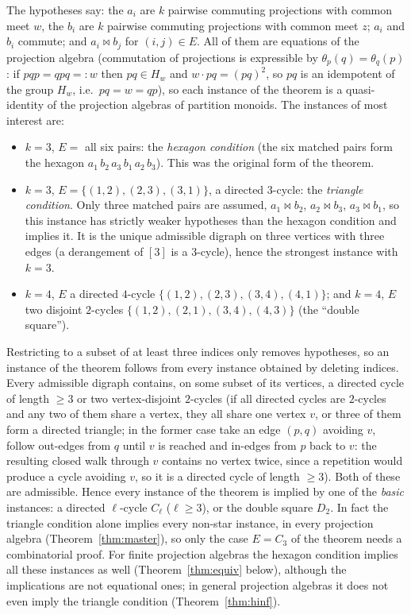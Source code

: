 \documentclass[11pt]{amsart}
\theoremstyle{definition}
\begin{document}
The hypotheses say: the $a_i$ are $k$ pairwise commuting projections with common meet $w$, the $b_i$ are $k$ pairwise commuting projections with common meet $z$; $a_i$ and $b_i$ commute; and $a_i\bowtie b_j$ for $(i,j)\in E$. All of them are equations of the projection algebra (commutation of projections is expressible by $\theta_p(q)=\theta_q(p)$: if $pqp=qpq=:w$ then $pq\in H_w$ and $w\cdot pq=(pq)^2$, so $pq$ is an idempotent of the group $H_w$, i.e.\ $pq=w=qp$), so each instance of the theorem is a quasi-identity of the projection algebras of partition monoids. The instances of most interest are:
\begin{itemize}[nosep]
\item $k=3$, $E=$ all six pairs: the \emph{hexagon condition} (the six matched pairs form the hexagon $a_1\,b_2\,a_3\,b_1\,a_2\,b_3$). This was the original form of the theorem.
\item $k=3$, $E=\{(1,2),(2,3),(3,1)\}$, a directed $3$-cycle: the \emph{triangle condition}. Only three matched pairs are assumed, $a_1\bowtie b_2$, $a_2\bowtie b_3$, $a_3\bowtie b_1$, so this instance has strictly weaker hypotheses than the hexagon condition and implies it. It is the unique admissible digraph on three vertices with three edges (a derangement of $[3]$ is a $3$-cycle), hence the strongest instance with $k=3$.
\item $k=4$, $E$ a directed $4$-cycle $\{(1,2),(2,3),(3,4),(4,1)\}$; and $k=4$, $E$ two disjoint $2$-cycles $\{(1,2),(2,1),(3,4),(4,3)\}$ (the ``double square'').
\end{itemize}
Restricting to a subset of at least three indices only removes hypotheses, so an instance of the theorem follows from every instance obtained by deleting indices. Every admissible digraph contains, on some subset of its vertices, a directed cycle of length $\ge3$ or two vertex-disjoint $2$-cycles (if all directed cycles are $2$-cycles and any two of them share a vertex, they all share one vertex $v$, or three of them form a directed triangle; in the former case take an edge $(p,q)$ avoiding $v$, follow out-edges from $q$ until $v$ is reached and in-edges from $p$ back to $v$: the resulting closed walk through $v$ contains no vertex twice, since a repetition would produce a cycle avoiding $v$, so it is a directed cycle of length $\ge3$). Both of these are admissible. Hence every instance of the theorem is implied by one of the \emph{basic} instances: a directed $\ell$-cycle $C_\ell$ ($\ell\ge3$), or the double square $D_2$. In fact the triangle condition alone implies every non-star instance, in every projection algebra (Theorem~\ref{thm:master}), so only the case $E=C_3$ of the theorem needs a combinatorial proof. For finite projection algebras the hexagon condition implies all these instances as well (Theorem~\ref{thm:equiv} below), although the implications are not equational ones; in general projection algebras it does not even imply the triangle condition (Theorem~\ref{thm:hinf}).
\end{document}
